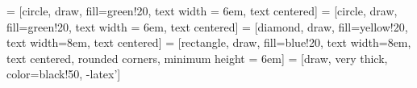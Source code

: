 \usetikzlibrary{shapes,arrows}
\usetikzlibrary{positioning}

 = [circle, draw, fill=green!20, text width = 6em, text centered]
 = [circle, draw, fill=green!20, text width = 6em, text centered]
 = [diamond, draw, fill=yellow!20, text width=8em, text centered]
 = [rectangle, draw, fill=blue!20, text width=8em, text centered, rounded corners, minimum height = 6em]
 = [draw, very thick, color=black!50, -latex']